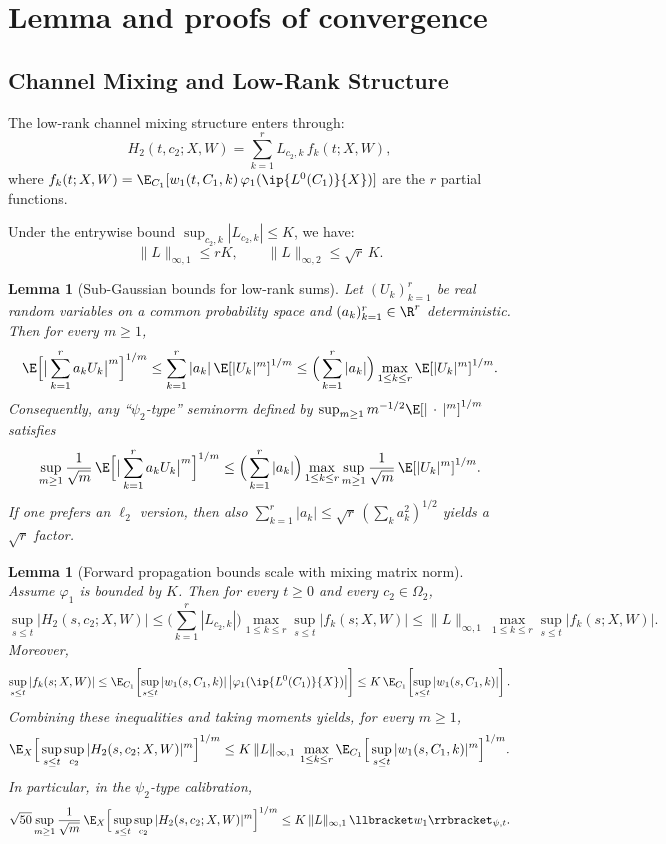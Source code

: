 \documentclass[nohyperref]{article}
\theoremstyle{plain}
\newtheorem{lemma}[theorem]{Lemma}
\theoremstyle{definition}
\theoremstyle{remark}
\begin{document}
\section{Lemma and proofs of convergence}
\label{app:technical-lemmas}

\subsection{Channel Mixing and Low-Rank Structure}
\label{app:channel-mixing}

The low-rank channel mixing structure enters through:
\[
H_2(t,c_2;X,W)=\sum_{k=1}^r L_{c_2,k}\,f_k(t;X,W),
\]
where $f_k(t;X,W)=\E_{C_1}[w_1(t,C_1,k)\,\varphi_1(\ip{L^0(C_1)}{X})]$ are the $r$ partial functions.

Under the entrywise bound $\sup_{c_2,k}|L_{c_2,k}|\le K$, we have:
\[
\|L\|_{\infty,1}\le rK,\qquad \|L\|_{\infty,2}\le \sqrt{r}\,K.
\]

\begin{lemma}[Sub-Gaussian bounds for low-rank sums]
\label{lem:lowrank-psi-app}
Let $(U_k)_{k=1}^r$ be real random variables on a common probability space and $(a_k)_{k=1}^r\in\R^r$ deterministic.
Then for every $m\ge 1$,
\[
\E\Big[\big|\sum_{k=1}^r a_k U_k\big|^m\Big]^{1/m}\le \sum_{k=1}^r |a_k|\,\E[|U_k|^m]^{1/m}
\le \Big(\sum_{k=1}^r |a_k|\Big)\max_{1\le k\le r}\E[|U_k|^m]^{1/m}.
\]
Consequently, any ``$\psi_2$-type'' seminorm defined by $\sup_{m\ge 1}m^{-1/2}\E[|\,\cdot\,|^m]^{1/m}$ satisfies
\[
\sup_{m\ge 1}\frac{1}{\sqrt{m}}\,\E\Big[\big|\sum_{k=1}^r a_k U_k\big|^m\Big]^{1/m}
\le \Big(\sum_{k=1}^r |a_k|\Big)\max_{1\le k\le r}\sup_{m\ge 1}\frac{1}{\sqrt{m}}\,\E[|U_k|^m]^{1/m}.
\]
If one prefers an $\ell_2$ version, then also $\sum_{k=1}^r |a_k|\le \sqrt{r}\,(\sum_k a_k^2)^{1/2}$ yields a $\sqrt{r}$ factor.
\end{lemma}

\begin{lemma}[Forward propagation bounds scale with mixing matrix norm]
\label{lem:H2-row-norm-app}
Assume $\varphi_1$ is bounded by $K$.
Then for every $t\ge 0$ and every $c_2\in\Omega_2$,
\[
\sup_{s\le t}\big|H_2(s,c_2;X,W)\big|
\le \Big(\sum_{k=1}^r |L_{c_2,k}|\Big)\max_{1\le k\le r}\sup_{s\le t}|f_k(s;X,W)|
\le \|L\|_{\infty,1}\,\max_{1\le k\le r}\sup_{s\le t}|f_k(s;X,W)|.
\]
Moreover,
\[
\sup_{s\le t}|f_k(s;X,W)|
\le \E_{C_1}\!\left[\sup_{s\le t}|w_1(s,C_1,k)|\,\big|\varphi_1(\ip{L^0(C_1)}{X})\big|\right]
\le K\,\E_{C_1}\!\left[\sup_{s\le t}|w_1(s,C_1,k)|\right].
\]
Combining these inequalities and taking moments yields, for every $m\ge 1$,
\[
\E_X\Big[\sup_{s\le t}\sup_{c_2}|H_2(s,c_2;X,W)|^m\Big]^{1/m}
\le K\,\|L\|_{\infty,1}\,\max_{1\le k\le r}\E_{C_1}\Big[\sup_{s\le t}|w_1(s,C_1,k)|^m\Big]^{1/m}.
\]
In particular, in the $\psi_2$-type calibration,
\[
\sqrt{50}\sup_{m\ge 1}\frac{1}{\sqrt{m}}\,
\E_X\Big[\sup_{s\le t}\sup_{c_2}|H_2(s,c_2;X,W)|^m\Big]^{1/m}
\le K\,\|L\|_{\infty,1}\,\llbracket w_1\rrbracket_{\psi,t}.
\]
\end{lemma}
\end{document}
